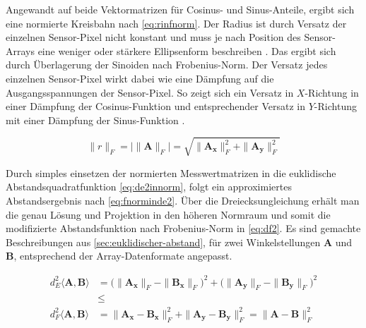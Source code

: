 \clearpage


Angewandt auf beide Vektormatrizen für Cosinus- und Sinus-Anteile, ergibt sich eine normierte Kreisbahn nach \autoref{eq:rinfnorm}. Der Radius ist durch Versatz der einzelnen Sensor-Pixel nicht konstant und muss je nach Position des Sensor-Arrays eine weniger oder stärkere Ellipsenform beschreiben \cite{Schuethe2019}. Das ergibt sich durch Überlagerung der Sinoiden nach Frobenius-Norm. Der Versatz jedes einzelnen Sensor-Pixel wirkt dabei wie eine Dämpfung auf die Ausgangsspannungen der Sensor-Pixel. So zeigt sich ein Versatz in $X$-Richtung in einer Dämpfung der Cosinus-Funktion und entsprechender Versatz in $Y$-Richtung mit einer Dämpfung der Sinus-Funktion \cite{Schuethe2019}.


\begin{equation}\label{eq:rinfnorm}
	\|r\|_F = \big|\|\mathbf{A}\|_F\big| = \sqrt{\|\mathbf{A_x}\|_F^2 + \|\mathbf{A_y}\|_F^2}
\end{equation}


Durch simples einsetzen der normierten Messwertmatrizen in die euklidische Abstandsquadratfunktion \autoref{eq:de2innorm}, folgt ein approximiertes Abstandsergebnis nach \autoref{eq:fnorminde2}. Über die Dreiecksungleichung erhält man die genau Lösung und Projektion in den höheren Normraum \cite{Plum2012}\cite{vandeGeijn2014} und somit die modifizierte Abstandsfunktion nach Frobenius-Norm \cite{Schuethe2020}\cite{Schuethe2020b} in \autoref{eq:df2}. Es sind gemachte Beschreibungen aus \autoref{sec:euklidischer-abstand}, für zwei Winkelstellungen $\mathbf{A}$ und $\mathbf{B}$, entsprechend der Array-Datenformate angepasst.


\begin{align}
\label{eq:fnorminde2}
d_E^2\langle\mathbf{A},\mathbf{B}\rangle &= \big(\|\mathbf{A_x}\|_F - \|\mathbf{B_x}\|_F\big)^2 + \big(\|\mathbf{A_y}\|_F - \|\mathbf{B_y}\|_F\big)^2 \\
&\le \nonumber \\
\label{eq:df2}
d_F^2\langle\mathbf{A},\mathbf{B}\rangle &= \|\mathbf{A_x} - \mathbf{B_x}\|_F^2 + \|\mathbf{A_y} - \mathbf{B_y}\|_F^2 = \|\mathbf{A} - \mathbf{B}\|_F^2
\end{align}


\clearpage

